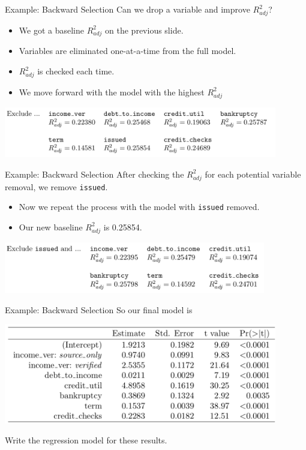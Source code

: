 \begin{frame}{Example: Backward Selection}
    Can we drop a variable and improve $R^2_{adj}$?
    \begin{itemize}
        \item We got a baseline $R^2_{adj}$ on the previous slide.
        \item Variables are eliminated one-at-a-time from the full model.
        \item $R^2_{adj}$ is checked each time.
        \item We move forward with the model with the highest $R^2_{adj}$
    \end{itemize}
    \begin{center}
        \includegraphics[width=4.7in]{images/back1.png}
    \end{center}
\end{frame}

\begin{frame}{Example: Backward Selection}
    After checking the $R^2_{adj}$ for each potential variable removal, we remove \texttt{issued}.
    \begin{itemize}
        \item Now we repeat the process with the model with \texttt{issued} removed. 
        \item Our new baseline $R^2_{adj}$ is 0.25854.
    \end{itemize}
    \begin{center}
        \includegraphics[width=4.5in]{images/back2.png}
    \end{center}
\end{frame}

\begin{frame}{Example: Backward Selection}
    So our final model is
    \begin{center}
        \includegraphics[width=4.7in]{images/finalmodel.png}
    \end{center}
    Write the regression model for these results.
\end{frame}

